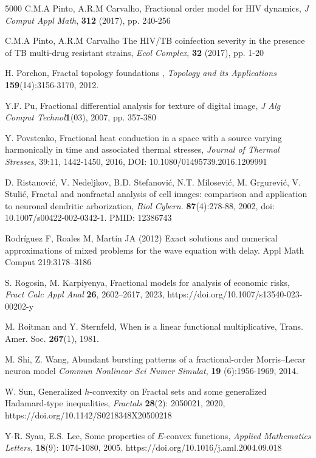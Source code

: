 \documentclass[10pt]{article}
\begin{document}
\begin{thebibliography}{5000}
 C.M.A Pinto, A.R.M Carvalho,
Fractional order model for HIV dynamics,
{\it J Comput Appl Math}, {\bf312} (2017), pp. 240-256 

 C.M.A Pinto, A.R.M Carvalho
The HIV/TB coinfection severity in the presence of TB multi-drug resistant strains,
{\it Ecol Complex}, {\bf32} (2017), pp. 1-20 

H. Porchon, Fractal topology foundations
, {\it Topology and its Applications}
{\bf159}(14):3156-3170, 2012. 

 Y.F. Pu,
Fractional differential analysis for texture of digital image, {\it J Alg Comput Technol}{\bf1}(03), 2007, pp. 357-380

 Y. Povstenko, Fractional heat conduction in a space with a source varying harmonically in time and associated thermal stresses, {\it Journal of Thermal Stresses}, 39:11, 1442-1450, 2016, DOI: 10.1080/01495739.2016.1209991

D. Ristanović, V. Nedeljkov, B.D. Stefanović, N.T. Milosević, M. Grgurević,  V. Stulić, Fractal and nonfractal analysis of cell images: comparison and application to neuronal dendritic arborization, {\it Biol Cybern.} {\bf87}(4):278-88, 2002, doi: 10.1007/s00422-002-0342-1.
PMID: 12386743


 Rodríguez F, Roales M, Martín JA (2012) Exact solutions and numerical approximations of mixed problems for the wave equation with delay. Appl Math Comput 219:3178–3186

 S. Rogosin, M. Karpiyenya,  Fractional models for analysis of economic risks, {\it Fract Calc Appl Anal} {\bf26}, 2602–2617, 2023, https://doi.org/10.1007/s13540-023-00202-y

 M. Roitman and Y. Sternfeld, When is a linear functional multiplicative, Trans. Amer. Soc. {\bf 267}(1), 1981.

 M. Shi, Z. Wang,
Abundant bursting patterns of a fractional-order Morris–Lecar neuron model
{\it Commun Nonlinear Sci Numer Simulat}, {\bf19} (6):1956-1969, 2014.

 W. Sun, Generalized $h$-convexity on Fractal sets and some generalized Hadamard-type inequalities, {\it Fractals} {\bf28}(2): 2050021, 2020,  https://doi.org/10.1142/S0218348X20500218

 Y-R. Syau, E.S. Lee, Some properties of  $E$-convex functions, {\it Applied Mathematics Letters}, {\bf 18}(9): 1074-1080, 2005. https://doi.org/10.1016/j.aml.2004.09.018


\end{thebibliography}
\end{document}
